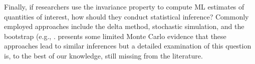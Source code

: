 \documentclass[11pt]{article}
\begin{document}
Finally, if researchers use the invariance property to compute ML estimates of quantities of interest, how should they conduct statistical inference?
Commonly employed approaches include the delta method, stochastic simulation, and the bootstrap (e.g., \cite{EfronTibshirani1993}.
\cite{KrinskyRobb1991} presents some limited Monte Carlo evidence that these approaches lead to similar inferences but a detailed examination of this question is, to the best of our knowledge, still missing from the literature.






\singlespace
\clearpage
\small


\end{document}
